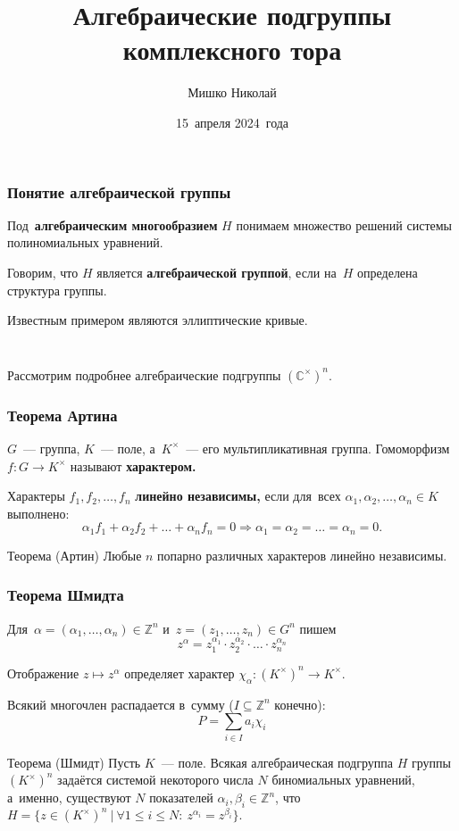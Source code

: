 \documentclass{beamer}
\title{Алгебраические подгруппы комплексного тора}
\author{Мишко Николай}
\institute{Сибирский федеральный университет\\Институт математики и фундаментальной информатики}
\date{15~апреля 2024~года}
\newcommand{\Z}{\mathbb{Z}}
\begin{document}
\begin{frame}
  \titlepage
\end{frame}

\begin{frame}
  \frametitle{Понятие алгебраической группы}

  Под~\textbf{алгебраическим многообразием} $H$ понимаем множество решений системы полиномиальных уравнений.

  Говорим, что $H$ является \textbf{алгебраической группой}, если на~$H$ определена структура группы.

  Известным примером являются эллиптические кривые.
  \begin{columns}[c]
    \begin{column}{0.3\textwidth}
      \begin{figure}
        
      \end{figure}
    \end{column}
  \end{columns}

  Рассмотрим подробнее алгебраические подгруппы $(\mathbb{C}^\times)^n$.
\end{frame}

\begin{frame}
  \frametitle{Теорема Артина}

  $G$~— группа, $K$~— поле, а~$K^{\times}$~— его мультипликативная группа.
  Гомоморфизм $f : G \rightarrow K^{\times}$ называют \textbf{характером.}

  Характеры $f_1, f_2, \ldots, f_n$ \textbf{линейно независимы,} если для~всех $\alpha_1, \alpha_2, \ldots, \alpha_n \in K$ выполнено:
  $$
      \alpha_1 f_1 + \alpha_2 f_2 + \ldots + \alpha_n f_n = 0 \Rightarrow \alpha_1 = \alpha_2 = \ldots = \alpha_n = 0.
  $$

  \begin{block}{Теорема (Артин)}
    Любые $n$ попарно различных характеров линейно независимы.
  \end{block}
\end{frame}

\begin{frame}
  \frametitle{Теорема Шмидта}

  Для~$\alpha = (\alpha_1, \ldots, \alpha_n) \in \Z^n$ и~$z = (z_1, \ldots, z_n) \in G^n$ пишем
  $$
    z^\alpha = z_1^{\alpha_1} \cdot z_2^{\alpha_2} \cdot \ldots \cdot z_n^{\alpha_n}
  $$

  Отображение $z \mapsto z^\alpha$ определяет характер $\chi_\alpha : (K^\times)^n \rightarrow K^\times$.

  Всякий многочлен распадается в~сумму ($I \subseteq \Z^n$ конечно):
  $$
    P = \sum_{i \in I} a_i \chi_i
  $$

  \begin{block}{Теорема (Шмидт)}
    Пусть $K$~— поле. Всякая алгебраическая подгруппа $H$ группы $(K^{\times})^n$ задаётся
    системой некоторого числа $N$ биномиальных уравнений, а~именно, существуют $N$ показателей $\alpha_i, \beta_i \in \mathbb{Z}^n$, что
    $
        H = \{ z \in (K^{\times})^n\ |\ \forall 1 \leq i \leq N{:}\ z^{\alpha_i} = z^{\beta_i} \}.
    $
  \end{block}
\end{frame}
\end{document}
